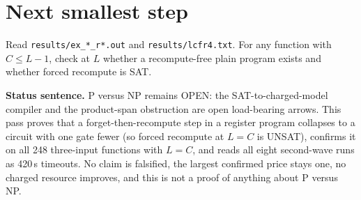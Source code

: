 \documentclass[11pt]{article}
\begin{document}
\section*{Next smallest step}
Read \texttt{results/ex\_*\_r*.out} and \texttt{results/lcfr4.txt}. For any function with $C\le L-1$, check at $L$ whether a recompute-free plain program exists and whether forced recompute is SAT.

\bigskip
\noindent\textbf{Status sentence.} P versus NP remains OPEN: the SAT-to-charged-model compiler and the product-span obstruction are open load-bearing arrows. This pass proves that a forget-then-recompute step in a register program collapses to a circuit with one gate fewer (so forced recompute at $L=C$ is UNSAT), confirms it on all 248 three-input functions with $L=C$, and reads all eight second-wave runs as 420\,s timeouts. No claim is falsified, the largest confirmed price stays one, no charged resource improves, and this is not a proof of anything about P versus NP.
\end{document}

